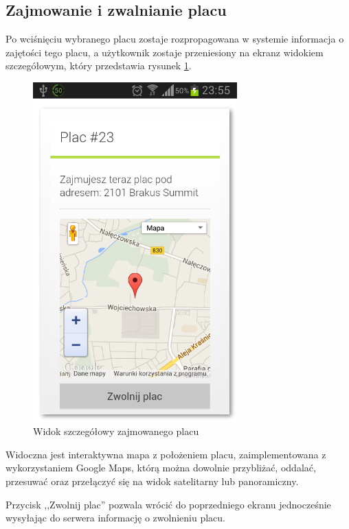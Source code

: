 \documentclass[twoside,a4paper,openright,12pt]{book}
\begin{document}
\subsection{Zajmowanie i zwalnianie placu}

Po wciśnięciu wybranego placu zostaje rozpropagowana w systemie informacja o zajętości tego placu, a użytkownik zostaje przeniesiony na ekranz  widokiem szczegółowym, który przedstawia rysunek \ref{fig:Zajmowany_plac_mobile}.

\begin{figure}[H]
\centering
\includegraphics[width=0.7\textwidth]{screenshots/android/szczegoly_placu.png}
\caption{Widok szczegółowy zajmowanego placu}
\label{fig:Zajmowany_plac_mobile}
\end{figure}

Widoczna jest interaktywna mapa z położeniem placu, zaimplementowana z wykorzystaniem Google Maps, którą można dowolnie przybliżać, oddalać, przesuwać oraz przełączyć się na widok satelitarny lub panoramiczny.

Przycisk ,,Zwolnij plac'' pozwala wrócić do poprzedniego ekranu jednocześnie wysyłając do serwera informację o zwolnieniu placu.
\end{document}
